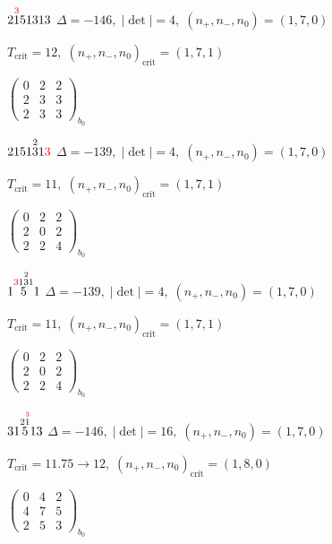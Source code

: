 \documentclass[10pt]{article}
\begin{document}
$2\overset{\textcolor{red}{3}}{1}51313$ \quad $\Delta=-146,\; |\det|=4,\; (n_+,n_-,n_0)=(1,7,0)$

\hspace{1em}$T_{\text{crit}}=12,\; (n_+,n_-,n_0)_{\text{crit}}=(1,7,1)$

\hspace{2em}$\left(\begin{smallmatrix}0 & 2 & 2 \\ 2 & 3 & 3 \\ 2 & 3 & 3\end{smallmatrix}\right)_{\!b_0}$

\smallskip

$2151\overset{2}{3}1\textcolor{red}{3}$ \quad $\Delta=-139,\; |\det|=4,\; (n_+,n_-,n_0)=(1,7,0)$

\hspace{1em}$T_{\text{crit}}=11,\; (n_+,n_-,n_0)_{\text{crit}}=(1,7,1)$

\hspace{2em}$\left(\begin{smallmatrix}0 & 2 & 2 \\ 2 & 0 & 2 \\ 2 & 2 & 4\end{smallmatrix}\right)_{\!b_0}$

\smallskip

$1\overset{\textcolor{red}{3}1\overset{2}{3}1}{5}1$ \quad $\Delta=-139,\; |\det|=4,\; (n_+,n_-,n_0)=(1,7,0)$

\hspace{1em}$T_{\text{crit}}=11,\; (n_+,n_-,n_0)_{\text{crit}}=(1,7,1)$

\hspace{2em}$\left(\begin{smallmatrix}0 & 2 & 2 \\ 2 & 0 & 2 \\ 2 & 2 & 4\end{smallmatrix}\right)_{\!b_0}$

\smallskip

$31\overset{2\overset{\textcolor{red}{3}}{1}}{5}13$ \quad $\Delta=-146,\; |\det|=16,\; (n_+,n_-,n_0)=(1,7,0)$

\hspace{1em}$T_{\text{crit}}=11.75 \to 12,\; (n_+,n_-,n_0)_{\text{crit}}=(1,8,0)$

\hspace{2em}$\left(\begin{smallmatrix}0 & 4 & 2 \\ 4 & 7 & 5 \\ 2 & 5 & 3\end{smallmatrix}\right)_{\!b_0}$
\end{document}
